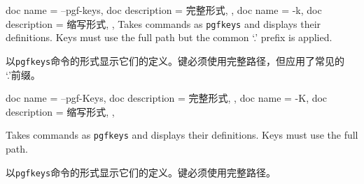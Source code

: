 \begin{docKeys}[
    doc no index,   %
    doc parameter = {~},
    ]
    {
    {
        doc name        = --pgf-keys,
        doc description = 完整形式,
    },
    {
        doc name        = -k,
        doc description = 缩写形式,
    },
    }
Takes commands as \texttt{pgfkeys} and displays their definitions. Keys must use the full path but the common `.\@cmd' prefix is applied.

以\texttt{pgfkeys}命令的形式显示它们的定义。键必须使用完整路径，但应用了常见的 `.\@cmd'前缀。
    
\end{docKeys}
    
    

\begin{docKeys}[
    doc no index,   %
    doc parameter = {~},
    ]
    {
    {
        doc name        = --pgf-Keys,
        doc description = 完整形式,
    },
    {
        doc name        = -K,
        doc description = 缩写形式,
    },
}

Takes commands as \texttt{pgfkeys} and displays their definitions. Keys must use the full path.

以\texttt{pgfkeys}命令的形式显示它们的定义。键必须使用完整路径。
    
\end{docKeys}
    
    